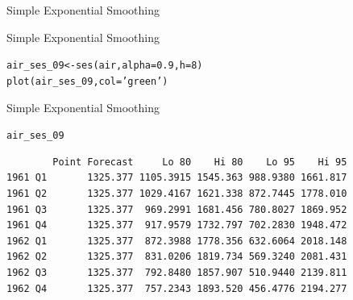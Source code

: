 \documentclass{beamer}\usepackage[]{graphicx}\usepackage[]{color}
\makeatletter
\newcommand{\hlnum}[1]{\textcolor[rgb]{0.824,0.412,0.118}{#1}}%
\newcommand{\hlstr}[1]{\textcolor[rgb]{1,0.894,0.71}{#1}}%
\newcommand{\hlstd}[1]{\textcolor[rgb]{1,0.894,0.769}{#1}}%
\newcommand{\hlkwb}[1]{\textcolor[rgb]{0.804,0.776,0.451}{#1}}%
\newcommand{\hlkwc}[1]{\textcolor[rgb]{0.78,0.941,0.545}{#1}}%
\newcommand{\hlkwd}[1]{\textcolor[rgb]{1,0.78,0.769}{#1}}%
\newenvironment{kframe}{%
 \def\at@end@of@kframe{}%
 \ifinner\ifhmode%
  \def\at@end@of@kframe{\end{minipage}}%
  \begin{minipage}{\columnwidth}%
 \fi\fi%
 \def\FrameCommand##1{\hskip\@totalleftmargin \hskip-\fboxsep
 \colorbox{shadecolor}{##1}\hskip-\fboxsep
     \hskip-\linewidth \hskip-\@totalleftmargin \hskip\columnwidth}%
 \MakeFramed {\advance\hsize-\width
   \@totalleftmargin\z@ \linewidth\hsize
   \@setminipage}}%
 {\par\unskip\endMakeFramed%
 \at@end@of@kframe}
\newenvironment{knitrout}{}{} %
\makeatother
\begin{document}
\begin{darkframes}
\begin{frame}[fragile]{Simple Exponential Smoothing}
    \end{frame} 
    
    
    
    \begin{frame}[fragile]{Simple Exponential Smoothing}
      \fontsize{8}{8}\selectfont
\begin{knitrout}
\begin{kframe}
\begin{alltt}
\hlstd{air_ses_09} \hlkwb{<-} \hlkwd{ses}\hlstd{(air,} \hlkwc{alpha} \hlstd{=} \hlnum{0.9}\hlstd{,} \hlkwc{h}\hlstd{=}\hlnum{8}\hlstd{)}
\hlkwd{plot}\hlstd{(air_ses_09,} \hlkwc{col}\hlstd{=}\hlstr{'green'}\hlstd{)}
\end{alltt}
\end{kframe}


\end{knitrout}
    \end{frame}
    
    \begin{frame}[fragile]{Simple Exponential Smoothing}
      \fontsize{8}{8}\selectfont
\begin{knitrout}
\begin{kframe}
\begin{alltt}
\hlstd{air_ses_09}
\end{alltt}
\begin{verbatim}
        Point Forecast     Lo 80    Hi 80    Lo 95    Hi 95
1961 Q1       1325.377 1105.3915 1545.363 988.9380 1661.817
1961 Q2       1325.377 1029.4167 1621.338 872.7445 1778.010
1961 Q3       1325.377  969.2991 1681.456 780.8027 1869.952
1961 Q4       1325.377  917.9579 1732.797 702.2830 1948.472
1962 Q1       1325.377  872.3988 1778.356 632.6064 2018.148
1962 Q2       1325.377  831.0206 1819.734 569.3240 2081.431
1962 Q3       1325.377  792.8480 1857.907 510.9440 2139.811
1962 Q4       1325.377  757.2343 1893.520 456.4776 2194.277
\end{verbatim}
\end{kframe}
\end{knitrout}
    \end{frame}
    
  \end{darkframes}
\end{document}
